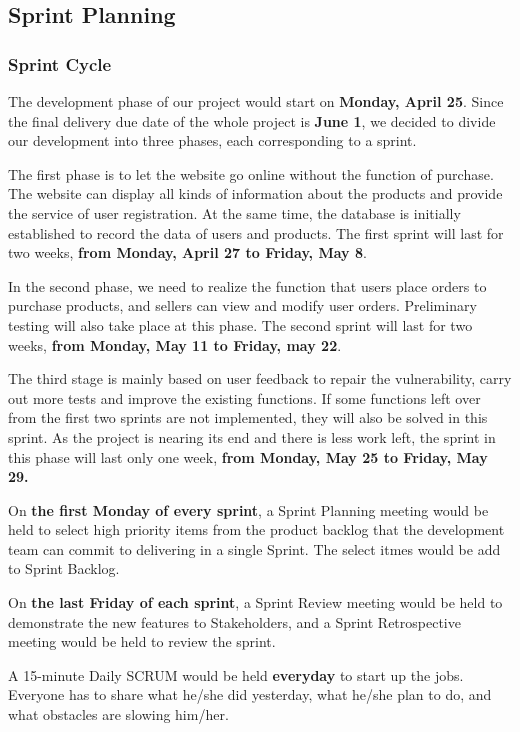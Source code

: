 \documentclass{report}
\begin{document}
\subsection{Sprint Planning}
\subsubsection{Sprint Cycle}
\label{sec:sprintCycle}
The development phase of our project would start on \textbf{Monday, April 25}. Since the final delivery due date of the whole project is \textbf{June 1}, we decided to divide our development into three phases, each corresponding to a sprint.

The first phase is to let the website go online without the function of purchase. The website can display all kinds of information about the products and provide the service of user registration. At the same time, the database is initially established to record the data of users and products. The first sprint will last for two weeks, \textbf{from Monday, April 27 to Friday, May 8}. 


In the second phase, we need to realize the function that users place orders to purchase products, and sellers can view and modify user orders. Preliminary testing will also take place at this phase. The second sprint will last for two weeks, \textbf{from Monday, May 11 to Friday, may 22}.

The third stage is mainly based on user feedback to repair the vulnerability, carry out more tests and improve the existing functions. If some functions left over from the first two sprints are not implemented, they will also be solved in this sprint. As the project is nearing its end and there is less work left, the sprint in this phase will last only one week, \textbf{from Monday, May 25 to Friday, May 29.}

On \textbf{the first Monday of every sprint}, a Sprint Planning meeting would be held to select high priority items from the product backlog that the development team can commit to delivering in a single Sprint. The select itmes would be add to Sprint Backlog.

On \textbf{the last Friday of each sprint}, a Sprint Review meeting would be held to demonstrate the new features to Stakeholders, and a Sprint Retrospective meeting would be held to review the sprint.

A 15-minute Daily SCRUM would be held \textbf{everyday} to start up the jobs. Everyone has to share what he/she did yesterday, what he/she plan to do, and what obstacles are slowing him/her.
\end{document}
